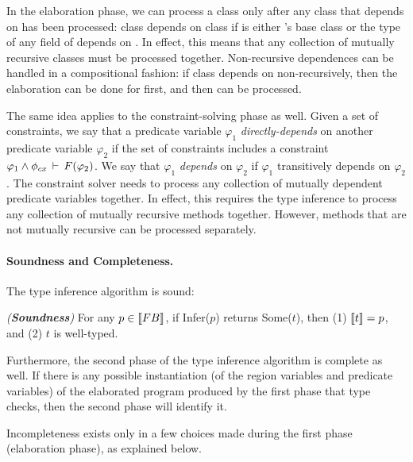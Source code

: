 In the elaboration phase, we can process a class  only after any class
 that  depends on has been processed: class  depends on
class  if  is either 's base class or the type of any field
of  depends on . In effect, this means that any collection of
mutually recursive classes must be processed together. Non-recursive
dependences can be handled in a compositional fashion: if class 
depends on  non-recursively, then the elaboration can be done for
 first, and then  can be processed.

The same idea applies to the constraint-solving phase as well.
Given a set of constraints, we say that a predicate variable $\varphi_1$
\emph{directly-depends} on another predicate variable $\varphi_2$ if the set of
constraints includes a constraint $\varphi_1 \wedge \phi_{cx}\,\vdash\,F(\varphi_2)$.
We say that $\varphi_1$ \emph{depends} on $\varphi_2$ if $\varphi_1$ transitively
depends on $\varphi_2$.
The constraint solver needs to process any collection of mutually dependent
predicate variables together.
In effect, this requires the type inference to process any collection of
mutually recursive methods together.
However, methods that are not mutually recursive can be processed separately.

\paragraph{Soundness and Completeness.}

The type inference algorithm is sound:

\begin{theorem}
\emph{(\textbf{Soundness})}
For any $p \in \llbracket {\sc FB} \rrbracket$, if Infer($p$) returns Some($t$), then
(1) $\llbracket t \rrbracket = p$, and
(2) $t$ is well-typed.
\end{theorem}

Furthermore, the second phase of the type inference algorithm is complete as well.
If there is any possible instantiation (of the region variables and predicate variables) of
the elaborated program produced by the first phase that type checks, then the second phase
will identify it.

Incompleteness exists only in a few choices made during the first phase (elaboration phase), as
explained below.

